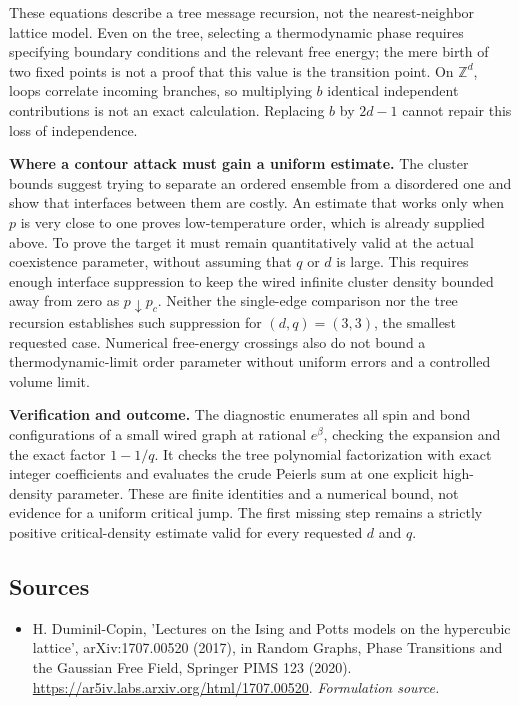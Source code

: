 \documentclass[11pt]{article}
\begin{document}
These equations describe a tree message recursion, not the nearest-neighbor
lattice model.  Even on the tree, selecting a thermodynamic phase requires
specifying boundary conditions and the relevant free energy; the mere birth
of two fixed points is not a proof that this value is the transition point.
On $\mathbb Z^d$, loops correlate incoming branches, so multiplying $b$
identical independent contributions is not an exact calculation.  Replacing
$b$ by $2d-1$ cannot repair this loss of independence.

\textbf{Where a contour attack must gain a uniform estimate.}
The cluster bounds suggest trying to separate an ordered ensemble from a
disordered one and show that interfaces between them are costly.  An
estimate that works only when $p$ is very close to one proves low-temperature
order, which is already supplied above.  To prove the target it must remain
quantitatively valid at the actual coexistence parameter, without assuming
that $q$ or $d$ is large.  This requires enough interface suppression to keep
the wired infinite cluster density bounded away from zero as
$p\downarrow p_c$.  Neither the single-edge comparison nor the tree recursion
establishes such suppression for $(d,q)=(3,3)$, the smallest requested case.
Numerical free-energy crossings also do not bound a thermodynamic-limit
order parameter without uniform errors and a controlled volume limit.

\textbf{Verification and outcome.}
The diagnostic enumerates all spin and bond configurations of a small wired
graph at rational $e^\beta$, checking the expansion and the exact factor
$1-1/q$.  It checks the tree polynomial factorization with exact integer
coefficients and evaluates the crude Peierls sum at one explicit high-density
parameter.  These are finite identities and a numerical bound, not evidence
for a uniform critical jump.  The first missing step remains a strictly
positive critical-density estimate valid for every requested $d$ and $q$.
\subsection{Sources}
\begin{itemize}
\item[S1]H. Duminil-Copin, 'Lectures on the Ising and Potts models on the hypercubic lattice', arXiv:1707.00520 (2017), in Random Graphs, Phase Transitions and the Gaussian Free Field, Springer PIMS 123 (2020).
\url{https://ar5iv.labs.arxiv.org/html/1707.00520}.
\textit{Formulation source.}
\end{itemize}
\end{document}
